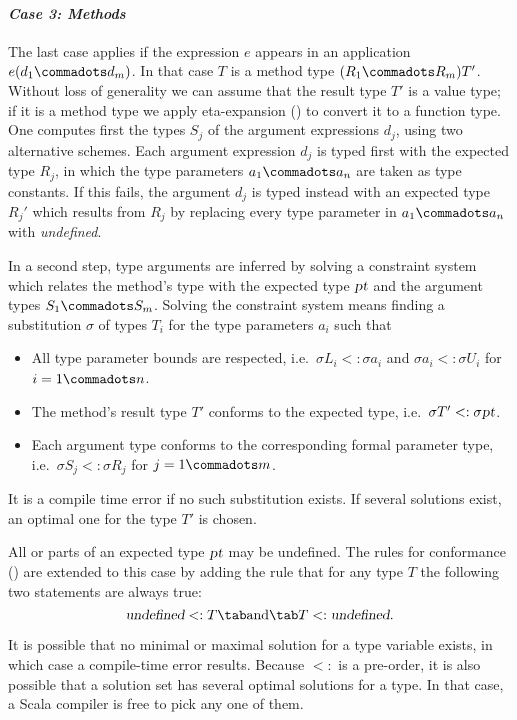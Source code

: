 \paragraph{\em Case 3: Methods} The last case applies if the expression
$e$ appears in an application $e(d_1 \commadots d_m)$. In that case
$T$ is a method type $(R_1 \commadots R_m)T'$. Without loss of
generality we can assume that the result type $T'$ is a value type; if
it is a method type we apply eta-expansion () to
convert it to a function type.  One computes first the types $S_j$ of
the argument expressions $d_j$, using two alternative schemes.  Each
argument expression $d_j$ is typed first with the expected type $R_j$,
in which the type parameters $a_1 \commadots a_n$ are taken as type
constants.  If this fails, the argument $d_j$ is typed instead with an
expected type $R_j'$ which results from $R_j$ by replacing every type
parameter in $a_1 \commadots a_n$ with {\sl undefined}.

In a second step, type arguments are inferred by solving a constraint
system which relates the method's type with the expected type
$\mbox{\sl pt}$ and the argument types $S_1 \commadots S_m$. Solving the
constraint system means
finding a substitution $\sigma$ of types $T_i$ for the type parameters
$a_i$ such that
\begin{itemize}
\item 
All type parameter bounds are respected, i.e.\ 
$\sigma L_i <: \sigma a_i$ and $\sigma a_i <: \sigma U_i$ for $i = 1 \commadots n$.
\item 
The method's result type $T'$ conforms to the expected type, i.e.\ 
$\sigma T' <: \sigma \mbox{\sl pt}$.
\item
Each argument type conforms to the corresponding formal parameter
type, i.e.\ 
$\sigma S_j <: \sigma R_j$ for $j = 1 \commadots m$.
\end{itemize}
It is a compile time error if no such substitution exists.  If several
solutions exist, an optimal one for the type $T'$ is chosen.

All or parts of an expected type $\mbox{\sl pt}$ may be undefined. The rules for
conformance (\sref{sec:conformance}) are extended to this case by adding
the rule that for any type $T$ the following two statements are always
true:
\[
   \mbox{\sl undefined} <: T \tab\mbox{and}\tab T <: \mbox{\sl undefined} .
\]

It is possible that no minimal or maximal solution for a type variable
exists, in which case a compile-time error results. Because $<:$ is a
pre-order, it is also possible that a solution set has several optimal
solutions for a type. In that case, a Scala compiler is free to pick
any one of them.

